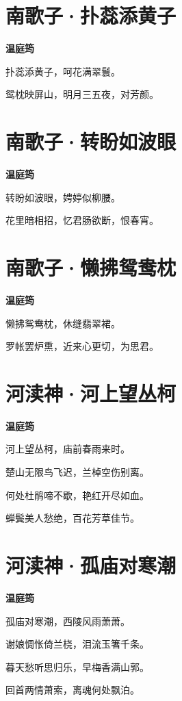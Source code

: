 \documentclass[12pt,a4paper]{ctexbook}
\begin{document}
\section{南歌子·扑蕊添黄子}
\textbf{温庭筠}\par\vspace{0.5em}
扑蕊添黄子，呵花满翠鬟。\par
鸳枕映屏山，明月三五夜，对芳颜。\par

\section{南歌子·转盼如波眼}
\textbf{温庭筠}\par\vspace{0.5em}
转盼如波眼，娉婷似柳腰。\par
花里暗相招，忆君肠欲断，恨春宵。\par

\section{南歌子·懒拂鸳鸯枕}
\textbf{温庭筠}\par\vspace{0.5em}
懒拂鸳鸯枕，休缝翡翠裙。\par
罗帐罢炉熏，近来心更切，为思君。\par

\section{河渎神·河上望丛柯}
\textbf{温庭筠}\par\vspace{0.5em}
河上望丛柯，庙前春雨来时。\par
楚山无限鸟飞迟，兰棹空伤别离。\par
何处杜鹃啼不歇，艳红开尽如血。\par
蝉鬓美人愁绝，百花芳草佳节。\par

\section{河渎神·孤庙对寒潮}
\textbf{温庭筠}\par\vspace{0.5em}
孤庙对寒潮，西陵风雨萧萧。\par
谢娘惆怅倚兰桡，泪流玉箸千条。\par
暮天愁听思归乐，早梅香满山郭。\par
回首两情萧索，离魂何处飘泊。\par
\end{document}
